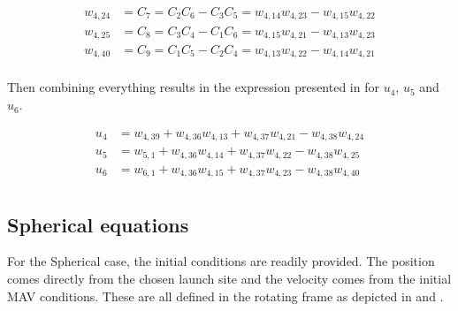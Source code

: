 \begin{equation} \label{eq:kHatAuxF}
\begin{split}
w_{4,24} &= C_{7} = C_{2}C_{6}-C_{3}C_{5} = w_{4,14}w_{4,23}-w_{4,15}w_{4,22} \\
w_{4,25} &= C_{8} = C_{3}C_{4}-C_{1}C_{6} = w_{4,15}w_{4,21}-w_{4,13}w_{4,23}\\
w_{4,40} &= C_{9} = C_{1}C_{5}-C_{2}C_{4} = w_{4,13}w_{4,22}-w_{4,14}w_{4,21}\\
\end{split}
\end{equation}

Then combining everything results in the expression presented in  for $u_{4}$, $u_{5}$ and $u_{6}$.

\begin{equation} \label{eq:finalAccAuxF}
\begin{split}
u_{4} &= w_{4,39}+w_{4,36}w_{4,13}+w_{4,37}w_{4,21}-w_{4,38}w_{4,24} \\
u_{5} &= w_{5,1}+w_{4,36}w_{4,14}+w_{4,37}w_{4,22}-w_{4,38}w_{4,25} \\
u_{6} &= w_{6,1}+w_{4,36}w_{4,15}+w_{4,37}w_{4,23}-w_{4,38}w_{4,40} \\
\end{split}
\end{equation}
















\subsection{Spherical equations}
\label{subsec:sphereq}
For the Spherical case, the initial conditions are readily provided. The position comes directly from the chosen launch site and the velocity comes from the initial \ac{MAV} conditions. These are all defined in the rotating frame as depicted in  and .

